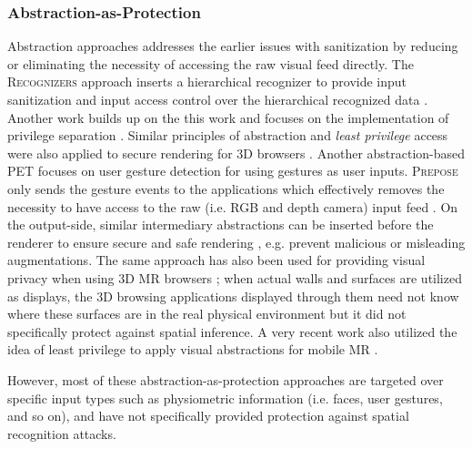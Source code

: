 \subsubsection{Abstraction-as-Protection} Abstraction approaches addresses the earlier issues with sanitization by reducing or eliminating the necessity of accessing the raw visual feed directly. %
The \textsc{Recognizers} approach inserts a hierarchical recognizer to provide input sanitization and input access control over the hierarchical recognized data \cite{jana2013enabling}. Another work builds up on the this work and focuses on the implementation of privilege separation \cite{thompson2016securing}. Similar principles of abstraction and \textit{least privilege} access were also applied to secure rendering for 3D browsers \cite{vilk2014least,vilk2015surroundweb}. %
Another abstraction-based PET focuses on user gesture detection for using gestures as user inputs. \textsc{Prepose} only sends the gesture events to the applications which effectively removes the necessity to have access to the raw (i.e. RGB and depth camera) input feed \cite{figueiredo2016prepose}. On the output-side, similar intermediary abstractions can be inserted before the renderer to ensure secure and safe rendering \cite{lebeck2016safely}, e.g. prevent malicious or misleading augmentations. The same approach has also been used for providing visual privacy when using 3D MR browsers \cite{vilk2015surroundweb};  when actual walls and surfaces are utilized as displays, the 3D browsing applications displayed through them need not know where these surfaces are in the real physical environment but it did not specifically protect against spatial inference. A very recent work also utilized the idea of least privilege to apply visual abstractions for mobile MR \cite{deguzman2019safeMR}. %

However, most of these abstraction-as-protection approaches are targeted over specific input types such as physiometric information (i.e. faces, user gestures, and so on), and have not specifically provided protection against spatial recognition attacks.

